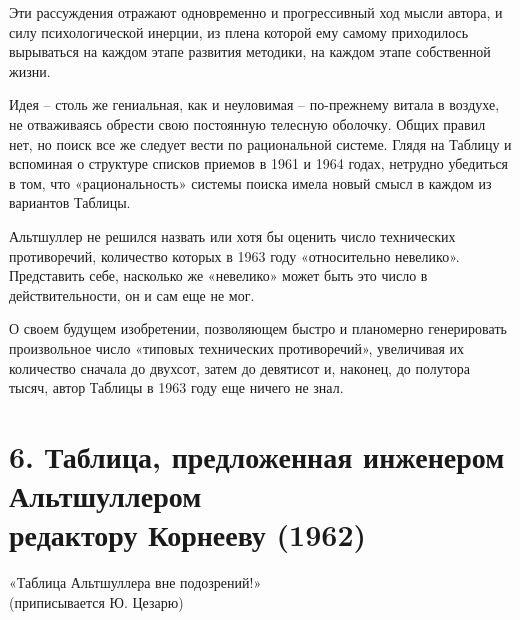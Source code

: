 \documentclass[11pt,a4paper]{article}
\begin{document}
Эти рассуждения отражают одновременно и прогрессивный ход мысли автора, и силу
психологической инерции, из плена которой ему самому приходилось вырываться на
каждом этапе развития методики, на каждом этапе собственной жизни.

Идея -- столь же гениальная, как и неуловимая -- по-прежнему витала в воздухе,
не отваживаясь обрести свою постоянную телесную оболочку. Общих правил нет, но
поиск все же следует вести по рациональной системе. Глядя на Таблицу и
вспоминая о структуре списков приемов в 1961 и 1964 годах, нетрудно убедиться
в том, что «рациональность» системы поиска имела новый смысл в каждом из
вариантов Таблицы.

Альтшуллер не решился назвать или хотя бы оценить число технических
противоречий, количество которых в 1963 году «относительно невелико».
Представить себе, насколько же «невелико» может быть это число в
действительности, он и сам еще не мог.

О своем будущем изобретении, позволяющем быстро и планомерно генерировать
произвольное число «типовых технических противоречий», увеличивая их
количество сначала до двухсот, затем до девятисот и, наконец, до полутора
тысяч, автор Таблицы в 1963 году еще ничего не знал.

\clearpage
\section*{6. Таблица, предложенная инженером Альтшуллером\\ редактору Корнееву 
  (1962)} 
\begin{flushright}
  «Таблица Альтшуллера вне подозрений!»\\
  (приписывается Ю. Цезарю)
\end{flushright}
\end{document}
